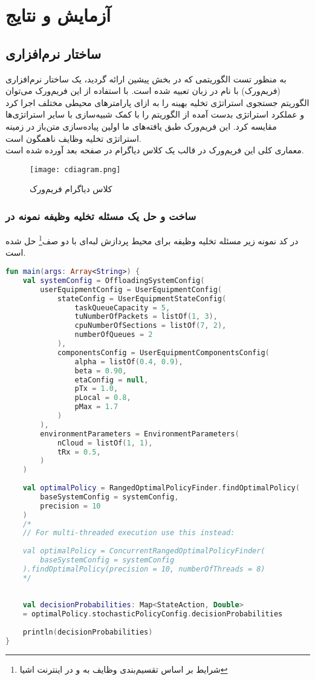 \chapter{آزمایش و نتایج}
\section{ساختار نرم‌افزاری }
به منظور تست الگوریتمی که در بخش پیشین ارائه گردید، یک ساختار نرم‌افزاری (فریم‌ورک) با نام  در زبان  تعبیه شده است. با استفاده از این فریم‌ورک می‌توان الگوریتم جستجوی استراتژی تخلیه بهینه را به ازای پارامترهای محیطی مختلف اجرا کرد و عملکرد استراتژی بدست آمده از الگوریتم را با کمک شبیه‌سازی با سایر استراتژی‌ها مقایسه کرد. این فریم‌ورک طبق یافته‌های ما اولین پیاده‌سازی متن‌باز در زمینه استراتژی تخلیه وظایف ناهمگون است. \\

معماری کلی این فریم‌ورک در قالب یک کلاس دیاگرام در صفحه بعد آورده شده است.
\newpage
\begin{figure}[H]
	\texttt{[image: cdiagram.png]}
	\caption{کلاس دیاگرام فریم‌ورک }
\end{figure}
\newpage
\subsection{ساخت و حل یک مسئله تخلیه وظیفه نمونه در }
در کد نمونه زیر مسئله تخلیه وظیفه‌ برای محیط پردازش لبه‌ای با دو صف\footnote{شرایط بر اساس تقسیم‌بندی وظایف به  و  در اینترنت اشیا} حل شده است.
\begin{latin}
\begin{lstlisting}[language=Kotlin]
fun main(args: Array<String>) {
	val systemConfig = OffloadingSystemConfig(
		userEquipmentConfig = UserEquipmentConfig(
			stateConfig = UserEquipmentStateConfig(
				taskQueueCapacity = 5,
				tuNumberOfPackets = listOf(1, 3),
				cpuNumberOfSections = listOf(7, 2),
				numberOfQueues = 2
			),
			componentsConfig = UserEquipmentComponentsConfig(
				alpha = listOf(0.4, 0.9),
				beta = 0.90,
				etaConfig = null,
				pTx = 1.0,
				pLocal = 0.8,
				pMax = 1.7
			)
		),
		environmentParameters = EnvironmentParameters(
			nCloud = listOf(1, 1),
			tRx = 0.5,
		)
	)
	
	val optimalPolicy = RangedOptimalPolicyFinder.findOptimalPolicy(
		baseSystemConfig = systemConfig, 
		precision = 10
	)
	/*
	// For multi-threaded execution use this instead:
	
	val optimalPolicy = ConcurrentRangedOptimalPolicyFinder(
		baseSystemConfig = systemConfig
	).findOptimalPolicy(precision = 10, numberOfThreads = 8)
	*/
	
	
	val decisionProbabilities: Map<StateAction, Double>
	= optimalPolicy.stochasticPolicyConfig.decisionProbabilities
	
	println(decisionProbabilities)
}
\end{lstlisting}
\end{latin}
\newpage

